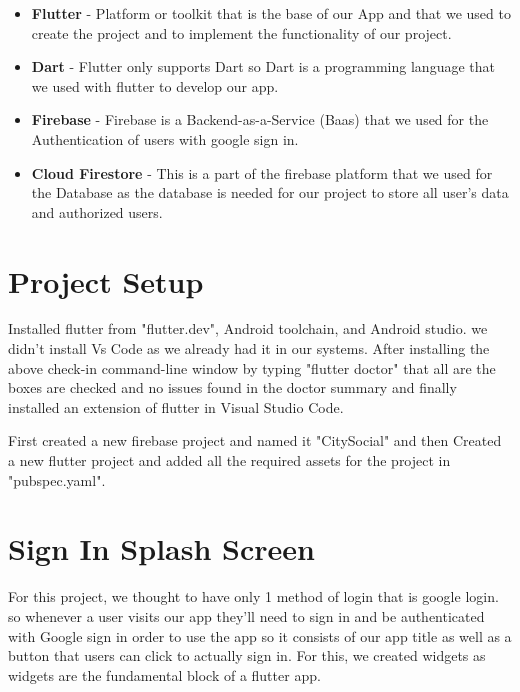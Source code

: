 \begin{itemize}
    \item \textbf{Flutter} - Platform or toolkit that is the base of our App and that we used to create the project and to implement the functionality of our project.
    \item \textbf{Dart} - Flutter only supports Dart so Dart is a programming language that we used with flutter to develop our app.
    \item \textbf{Firebase} - Firebase is a Backend-as-a-Service (Baas) that we used for the Authentication of users with google sign in.
    \item \textbf{Cloud Firestore} - This is a part of the firebase platform that we used for the Database as the database is needed for our project to store all user's data and authorized users.
\end{itemize}
\section{Project Setup}
Installed flutter from "flutter.dev", Android toolchain, and Android studio. we didn't install Vs Code as we already had it in our systems. After installing the above check-in command-line window by typing "flutter doctor" that all are the boxes are checked and no issues found in the doctor summary and finally installed an extension of flutter in Visual Studio Code. 

First created a new firebase project and named it "CitySocial" and then Created a new flutter project and added all the required assets for the project in "pubspec.yaml". 

\section{Sign In Splash Screen}
For this project, we thought to have only 1 method of login that is google login. so whenever a user visits our app they'll need to sign in and be authenticated with Google sign in order to use the app so it consists of our app title as well as a button that users can click to actually sign in. For this, we created widgets as widgets are the fundamental block of a flutter app.

